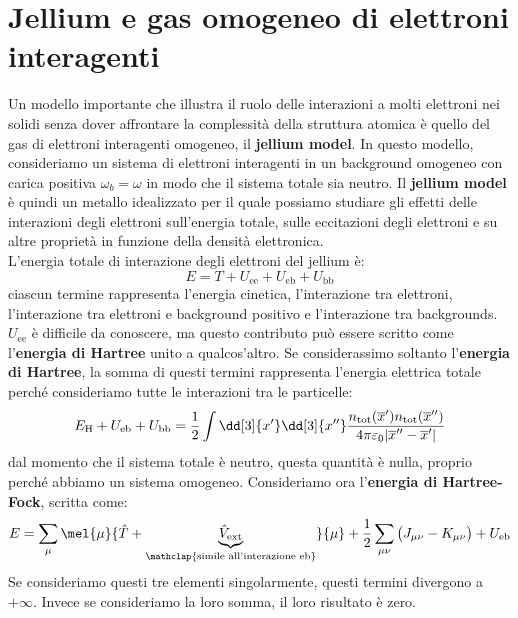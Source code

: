 \section{Jellium e gas omogeneo di elettroni interagenti}
Un modello importante che illustra il ruolo delle interazioni a molti elettroni nei solidi senza dover affrontare la complessità della struttura atomica è quello del gas di elettroni interagenti omogeneo, il \textbf{jellium model}. In questo modello, consideriamo un sistema di elettroni interagenti in un background omogeneo con carica positiva $\omega_b=\omega$ in modo che il sistema totale sia neutro. Il \textbf{jellium model} è quindi un metallo idealizzato per il quale possiamo studiare gli effetti delle interazioni degli elettroni sull'energia totale, sulle eccitazioni degli elettroni e su altre proprietà in funzione della densità elettronica.\\
L'energia totale di interazione degli elettroni del jellium è:
\begin{equation*}
    E=T+U_{\text{ee}}+U_{\text{eb}}+U_{\text{bb}}
\end{equation*}
ciascun termine rappresenta l'energia cinetica, l'interazione tra elettroni, l'interazione tra elettroni e background positivo e l'interazione tra backgrounds.
$U_{\text{ee}}$ è difficile da conoscere, ma questo contributo può essere scritto come l'\textbf{energia di Hartree} unito a qualcos'altro. Se considerassimo soltanto l'\textbf{energia di Hartree}, la somma di questi termini rappresenta l'energia elettrica totale perché consideriamo tutte le interazioni tra le particelle:
\begin{equation*}
    E_{\text H}+U_{\text{eb}}+U_{\text{bb}}=\frac 12 \int \dd[3]{x'}\dd[3]{x''}\frac{n_{\text{tot}}(\overline{x}')n_{\text{tot}}(\overline{x}'')}{4\pi\varepsilon_0|\overline{x}''-\overline{x}'|}
\end{equation*}
dal momento che il sistema totale è neutro, questa quantità è nulla, proprio perché abbiamo un sistema omogeneo. Consideriamo ora l'\textbf{energia di Hartree-Fock}, scritta come:
\begin{equation*}
    E=\sum_{\mu}\mel{\mu}{\hat T + \underbrace{\hat{V}_{\text{ext}}}_{\mathclap{\text{simile all'interazione eb}}}}{\mu}+\frac 12 \sum_{\mu\nu}\big(J_{\mu\nu}-K_{\mu\nu}\big)+U_{\text{eb}}
\end{equation*}
Se consideriamo questi tre elementi singolarmente, questi termini divergono a $+\infty$. Invece se consideriamo la loro somma, il loro risultato è zero. \\
